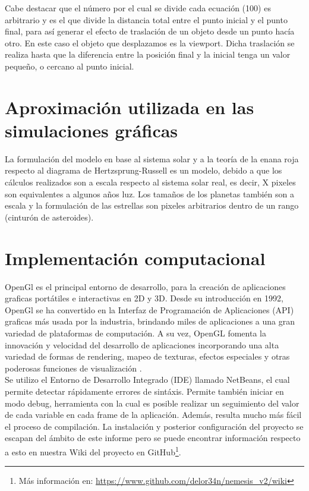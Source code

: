 \documentclass[journal]{IEEEtran}
\begin{document}
Cabe destacar que el número por el cual se divide cada ecuación (100) es arbitrario y es el que divide la distancia total entre el punto inicial y el punto final, para así generar el efecto de traslación de un objeto desde un punto hacía otro. En este caso el objeto que desplazamos es la viewport. Dicha traslación se realiza hasta que la diferencia entre la posición final y la inicial tenga un valor pequeño, o cercano al punto inicial.

\section{Aproximación utilizada en las simulaciones gráficas}

La formulación del modelo en base al sistema solar y a la teoría de la enana roja respecto al diagrama de Hertzsprung-Russell \cite{russel} es un modelo, debido a que los cálculos realizados son a escala respecto al sistema solar real, es decir, X pixeles son equivalentes a algunos años luz. Los tamaños de los planetas también son a escala y la formulación de las estrellas son pixeles arbitrarios dentro de un rango (cinturón de asteroides).

\section{Implementación computacional}

OpenGl es el principal entorno de desarrollo, para la creación de aplicaciones graficas portátiles e interactivas en  2D y 3D. Desde su introducción en 1992, OpenGl se ha convertido en la Interfaz de Programación de Aplicaciones (API) graficas más usada por la industria, brindando miles de aplicaciones a una gran variedad de plataformas de computación. A su vez, OpenGL fomenta la innovación y velocidad del desarrollo de aplicaciones incorporando una alta variedad de formas de rendering, mapeo de texturas, efectos especiales y otras poderosas funciones de visualización \cite{opengl}.\\

Se utilizo el Entorno de Desarrollo Integrado (IDE) llamado NetBeans, el cual permite detectar rápidamente errores de sintáxis. Permite también iniciar en modo debug, herramienta con la cual es posible realizar un seguimiento del valor de cada variable en cada frame de la aplicación. Además, resulta mucho más fácil el proceso de compilación. La instalación y posterior configuración del proyecto se escapan del ámbito de este informe pero se puede encontrar información respecto a esto en nuestra Wiki del proyecto en GitHub\footnote{Más información en: \url{https://www.github.com/delor34n/nemesis_v2/wiki}}.\\
\end{document}
